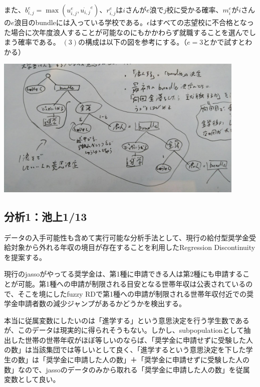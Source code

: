 \documentclass{jsarticle}
\begin{document}
	また、$b_{i, j}^e = \max(u_{i, j}^e, \dot{u_{i, j}}^e)$、$r_{i, j}^e$は$i$さんが$e$浪で$j$校に受かる確率、$m_i^e$が$i$さんの$e$浪目のbundleには入っている学校である。$\epsilon$はすべての志望校に不合格となった場合に次年度浪人することが可能なのにもかかわらず就職することを選んでしまう確率である。
	$(3)$の構成は以下の図を参考にする。（$e = 3$とかで試すとわかる）
	\begin{center}
	\includegraphics[width = 12cm]{fig1.png}
	\end{center}
	
	\subsection{分析1：池上1/13}
	データの入手可能性も含めて実行可能な分析手法として、現行の給付型奨学金受給対象から外れる年収の境目が存在することを利用したRegression Discontinuityを提案する。
	\par
	現行のjassoがやってる奨学金は、第1種に申請できる人は第2種にも申請することが可能。第1種への申請が制限される目安となる世帯年収は公表されているので、そこを境にしたfuzzy RDで第1種への申請が制限される世帯年収付近での奨学金申請者数の減少ジャンプがあるかどうかを検出する。
	\par
	本当に従属変数にしたいのは「進学する」という意思決定を行う学生数であるが、このデータは現実的に得られそうもない。しかし、subpopulationとして抽出した世帯の世帯年収がほぼ等しいのならば、「奨学金に申請せずに受験した人の数」は当該集団では等しいとして良く、「進学するという意思決定を下した学生の数」は「奨学金に申請した人の数」＋「奨学金に申請せずに受験した人の数」なので、jassoのデータのみから取れる「奨学金に申請した人の数」を従属変数として良い。
	
\end{document}
